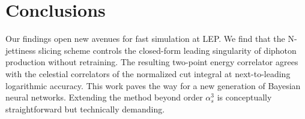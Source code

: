 \section{Conclusions}\label{sec:conclusions}

Our findings open new avenues for fast simulation at LEP. We find that
the N-jettiness slicing scheme controls the closed-form leading
singularity of diphoton production without retraining. The resulting
two-point energy correlator agrees with the celestial correlators of the
normalized cut integral at next-to-leading logarithmic accuracy. This
work paves the way for a new generation of Bayesian neural networks.
Extending the method beyond order $\alpha_s^3$ is conceptually
straightforward but technically demanding.

